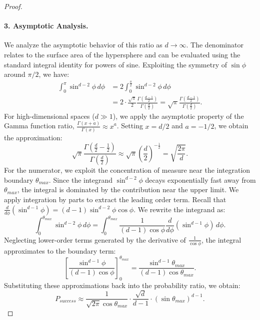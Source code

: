 \documentclass{article}
\theoremstyle{plain}
\theoremstyle{definition}
\theoremstyle{remark}
\begin{document}
\begin{proof}
\paragraph{3. Asymptotic Analysis.}
We analyze the asymptotic behavior of this ratio as $d \to \infty$. The denominator relates to the surface area of the hypersphere and can be evaluated using the standard integral identity for powers of sine. Exploiting the symmetry of $\sin \phi$ around $\pi/2$, we have:
\begin{align}
    \int_0^{\pi} \sin^{d-2} \phi \, d\phi &= 2 \int_0^{\frac{\pi}{2}} \sin^{d-2} \phi \, d\phi \nonumber \\
    &= 2 \cdot \frac{\sqrt{\pi}}{2} \frac{\Gamma(\frac{d-1}{2})}{\Gamma(\frac{d}{2})} = \sqrt{\pi} \frac{\Gamma(\frac{d-1}{2})}{\Gamma(\frac{d}{2})}.
\end{align}
For high-dimensional spaces ($d \gg 1$), we apply the asymptotic property of the Gamma function ratio, $\frac{\Gamma(x+a)}{\Gamma(x)} \approx x^a$. Setting $x = d/2$ and $a = -1/2$, we obtain the approximation:
\begin{equation}
    \sqrt{\pi} \frac{\Gamma(\frac{d}{2} - \frac{1}{2})}{\Gamma(\frac{d}{2})} \approx \sqrt{\pi} \left( \frac{d}{2} \right)^{-\frac{1}{2}} = \sqrt{\frac{2\pi}{d}}.
\end{equation}
For the numerator, we exploit the concentration of measure near the integration boundary $\theta_{max}$. Since the integrand $\sin^{d-2} \phi$ decays exponentially fast away from $\theta_{max}$, the integral is dominated by the contribution near the upper limit. We apply integration by parts to extract the leading order term. 
Recall that $\frac{d}{d\phi}(\sin^{d-1} \phi) = (d-1)\sin^{d-2} \phi \cos \phi$. We rewrite the integrand as:
\begin{equation}
    \int_0^{\theta_{max}} \sin^{d-2} \phi \, d\phi = \int_0^{\theta_{max}} \frac{1}{(d-1)\cos \phi} \frac{d}{d\phi}(\sin^{d-1} \phi) \, d\phi.
\end{equation}
Neglecting lower-order terms generated by the derivative of $\frac{1}{\cos \phi}$, the integral approximates to the boundary term:
\begin{equation}
    \left[ \frac{\sin^{d-1} \phi}{(d-1)\cos \phi} \right]_0^{\theta_{max}} = \frac{\sin^{d-1} \theta_{max}}{(d-1) \cos \theta_{max}}.
\end{equation}
Substituting these approximations back into the probability ratio, we obtain:
\begin{equation}
    P_{success} \approx \frac{1}{\sqrt{2\pi} \cos \theta_{max}} \cdot \frac{\sqrt{d}}{d-1} \cdot (\sin \theta_{max})^{d-1}.

\end{equation}
\end{proof}
\end{document}
